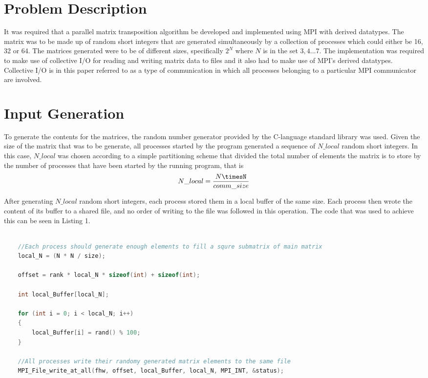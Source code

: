 \documentclass[journal]{IEEEtran}
\begin{document}
\section{Problem Description}

\noindent
It was required that a parallel matrix transposition algorithm be developed and implemented using MPI with derived datatypes. The matrix was to be made up of random short integers that are generated simultaneously by a collection of processes which could either be 16, 32 or 64. The matrices generated were to be of different sizes, specifically $2^N$ where $N$ is in the set ${3, 4 ... 7}$. The implementation was required to make use of collective I/O for reading and writing matrix data to files and it also had to make use of MPI's derived datatypes. Collective I/O is in this paper referred to as a type of communication in which all processes belonging to a particular MPI communicator are involved.

\section{Input Generation}

\noindent
To generate the contents for the matrices, the random number generator provided by the C-language standard library was used. Given the size of the matrix that was to be generate, all processes started by the program generated a sequence of $N\_local$ random short integers. In this case, $N\_local$ was chosen according to a simple partitioning scheme that divided the total number of elements the matrix is to store by the number of processes that have been started by the running program, that is 
\begin{equation}
    N\_local = \frac{N\timesN}{comm\_size}
\end{equation}

\noindent
After generating $N\_local$ random short integers, each process stored them in a local buffer of the same size. Each process then wrote the content of its buffer to a shared file, and no order of writing to the file was followed in this operation. The code that was used to achieve this can be seen in Listing 1.

\begin{lstlisting}[language = C, caption = input matrix file generation]

    //Each process should generate enough elements to fill a squre submatrix of main matrix
    local_N = (N * N / size);

    offset = rank * local_N * sizeof(int) + sizeof(int);

    int local_Buffer[local_N];

    for (int i = 0; i < local_N; i++)
    {
        local_Buffer[i] = rand() % 100;
    }

    //All processes write their randomy generated matrix elements to the same file
    MPI_File_write_at_all(fhw, offset, local_Buffer, local_N, MPI_INT, &status);
\end{lstlisting}
\end{document}
